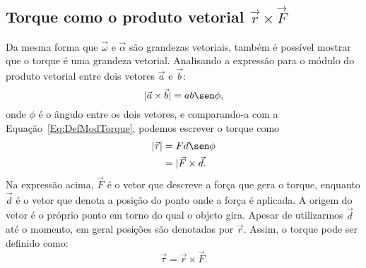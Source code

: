 
\subsection{Torque como o produto vetorial $\vec{r}\times\vec{F}$}

Da mesma forma que $\vec{\omega}$ e $\vec{\alpha}$ são grandezas vetoriais, também é possível mostrar que o torque é uma grandeza vetorial. Analisando a expressão para o módulo do produto vetorial entre dois vetores $\vec{a}$ e $\vec{b}$:
\begin{equation}
  |\vec{a}\times\vec{b}| = ab\sen\phi,
\end{equation}
%
onde $\phi$ é o ângulo entre os dois vetores, e comparando-a com a Equação~\eqref{Eq:DefModTorque}, podemos escrever o torque como
\begin{align}
  |\vec{\tau}| &= F d \sen\phi \\
  &= |\vec{F}\times\vec{d}.
\end{align}
%
Na expressão acima, $\vec{F}$ é o vetor que descreve a força que gera o torque, enquanto $\vec{d}$ é o vetor que denota a posição do ponto onde a força é aplicada. A origem do vetor é o próprio ponto em torno do qual o objeto gira. Apesar de utilizarmos $\vec{d}$ até o momento, em geral posições são denotadas por $\vec{r}$. Assim, o torque pode ser definido como: 
\begin{equation}\label{Eq:DefTorque}
  \vec{\tau} = \vec{r}\times\vec{F}.
\end{equation}

